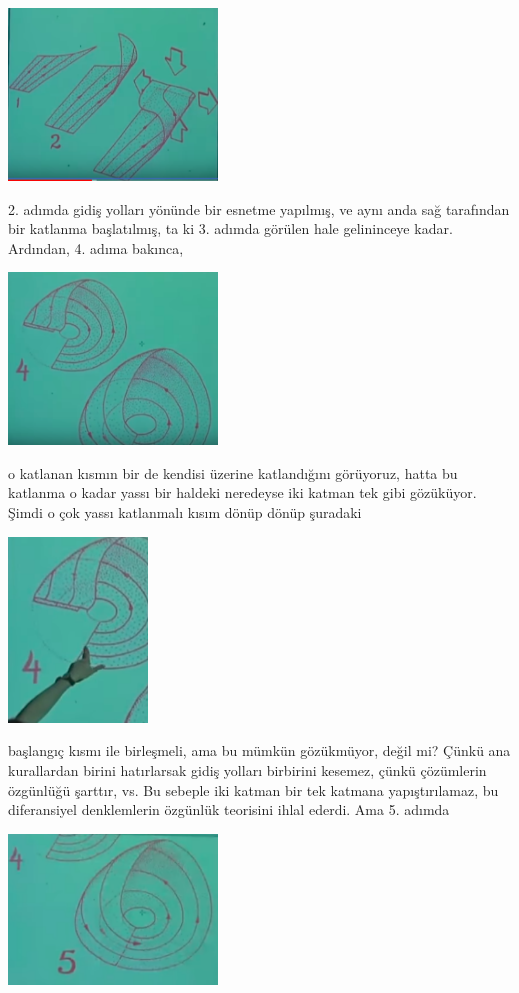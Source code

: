 \documentclass[12pt,fleqn]{article}\usepackage{../../common}
\begin{document}
\includegraphics[width=15em]{23_17.png}

2. adımda gidiş yolları yönünde bir esnetme yapılmış, ve aynı anda sağ
tarafından bir katlanma başlatılmış, ta ki 3. adımda görülen hale gelininceye
kadar. Ardından, 4. adıma bakınca,

\includegraphics[width=15em]{23_18.png}

o katlanan kısmın bir de kendisi üzerine katlandığını görüyoruz, hatta bu
katlanma o kadar yassı bir haldeki neredeyse iki katman tek gibi
gözüküyor. Şimdi o çok yassı katlanmalı kısım dönüp dönüp şuradaki

\includegraphics[width=10em]{23_19.png}

başlangıç kısmı ile birleşmeli, ama bu mümkün gözükmüyor, değil mi? Çünkü ana
kurallardan birini hatırlarsak gidiş yolları birbirini kesemez, çünkü çözümlerin
özgünlüğü şarttır, vs. Bu sebeple iki katman bir tek katmana yapıştırılamaz, bu
diferansiyel denklemlerin özgünlük teorisini ihlal ederdi. Ama 5. adımda

\includegraphics[width=15em]{23_20.png}
\end{document}
